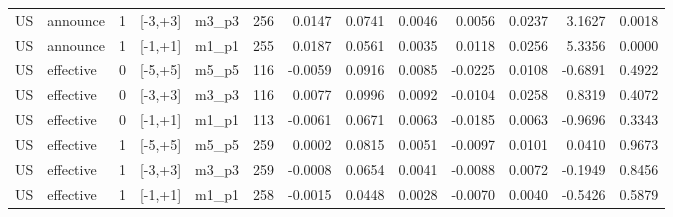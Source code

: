 \begin{tabular}{llrllrrrrrrrr}
US & announce & 1 & [-3,+3] & m3_p3 & 256 & 0.0147 & 0.0741 & 0.0046 & 0.0056 & 0.0237 & 3.1627 & 0.0018 \\
US & announce & 1 & [-1,+1] & m1_p1 & 255 & 0.0187 & 0.0561 & 0.0035 & 0.0118 & 0.0256 & 5.3356 & 0.0000 \\
US & effective & 0 & [-5,+5] & m5_p5 & 116 & -0.0059 & 0.0916 & 0.0085 & -0.0225 & 0.0108 & -0.6891 & 0.4922 \\
US & effective & 0 & [-3,+3] & m3_p3 & 116 & 0.0077 & 0.0996 & 0.0092 & -0.0104 & 0.0258 & 0.8319 & 0.4072 \\
US & effective & 0 & [-1,+1] & m1_p1 & 113 & -0.0061 & 0.0671 & 0.0063 & -0.0185 & 0.0063 & -0.9696 & 0.3343 \\
US & effective & 1 & [-5,+5] & m5_p5 & 259 & 0.0002 & 0.0815 & 0.0051 & -0.0097 & 0.0101 & 0.0410 & 0.9673 \\
US & effective & 1 & [-3,+3] & m3_p3 & 259 & -0.0008 & 0.0654 & 0.0041 & -0.0088 & 0.0072 & -0.1949 & 0.8456 \\
US & effective & 1 & [-1,+1] & m1_p1 & 258 & -0.0015 & 0.0448 & 0.0028 & -0.0070 & 0.0040 & -0.5426 & 0.5879 \\
\bottomrule
\end{tabular}
